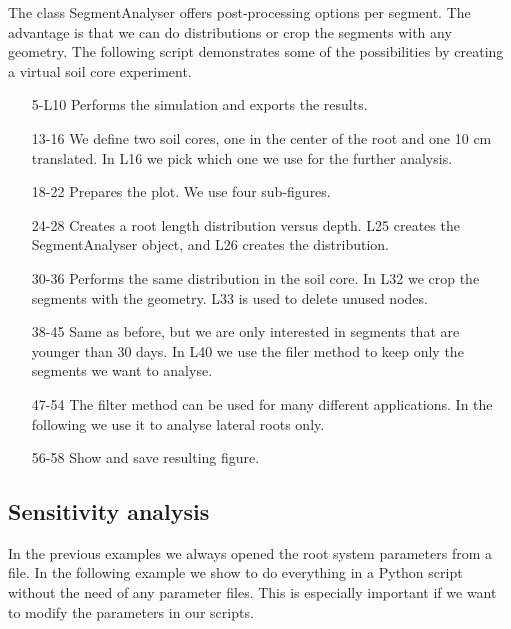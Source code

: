 \documentclass[a4paper]{article}
\begin{document}
The class SegmentAnalyser offers post-processing options per segment. 
The advantage is that we can do distributions or crop the segments with any geometry. 
The following script demonstrates some of the possibilities by creating a virtual soil core experiment. 



\begin{itemize}

\item[5-L10] Performs the simulation and exports the results.

\item[13-16] We define two soil cores, one in the center of the root and one 10 cm translated. In L16 we pick which one we use for the further analysis. 

\item[18-22] Prepares the plot. We use four sub-figures. 

\item[24-28] Creates a root length distribution versus depth. L25 creates the SegmentAnalyser object, and L26 creates the distribution.

\item[30-36] Performs the same distribution in the soil core. In L32 we crop the segments with the geometry. L33 is used to delete unused nodes. 

\item[38-45] Same as before, but we are only interested in segments that are younger than 30 days. In L40 we use the filer method to keep only the segments we want to analyse. 

\item[47-54] The filter method can be used for many different applications. In the following we use it to analyse lateral roots only. 

\item[56-58] Show and save resulting figure.

\end{itemize}



\subsection{Sensitivity analysis} \label{sec:sa}

In the previous examples we always opened the root system parameters from a file. 
In the following example we show to do everything in a Python script without the need of any parameter files. 
This is especially important if we want to modify the parameters in our scripts. 
\end{document}

